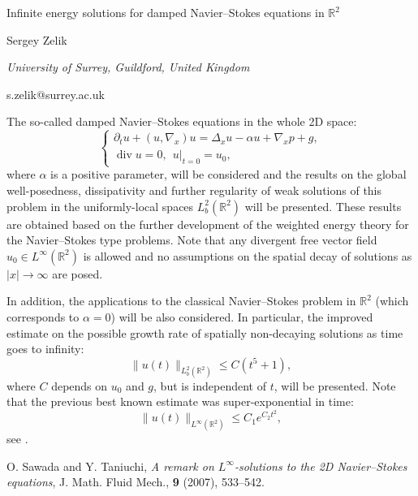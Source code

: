 \documentclass[10pt,a4paper]{article}
\def\R{\mathbb{R}}
\begin{document}
\begin{center}

{\Large Infinite energy solutions for damped Navier--Stokes equations in $\mathbb R^2$}

\bigskip

{\sc Sergey Zelik}

{\small\it  University of Surrey, Guildford, United Kingdom}

{\small\rm s.zelik@surrey.ac.uk}

\end{center}

\bigskip


The so-called damped Navier--Stokes equations in the whole 2D space:
\begin{equation*}
\begin{cases}
{\partial_t}u+(u,{\nabla_x})u={\Delta_x} u-\alpha u+{\nabla_x} p+g,\\ {\operatorname{div}}
u=0,\ \
u\big|_{t=0}=u_0,
\end{cases}
\end{equation*}
where $\alpha$ is a positive parameter, will be considered and the results on
the global well-posedness, dissipativity and further regularity of weak solutions of this problem
in the uniformly-local spaces $L^2_b(\R^2)$ will be presented. These results are obtained 
based on the further development of the weighted
energy theory for the Navier--Stokes type problems. Note that any divergent free vector field
$u_0\in L^\infty(\mathbb R^2)$ is allowed and no assumptions on the spatial decay of solutions as $|x|\to\infty$ are
posed.
\par
In addition, the applications to the classical Navier--Stokes
problem in $\mathbb R^2$ (which corresponds to $\alpha=0$) will be also considered. In particular, the improved estimate on the possible growth rate of spatially non-decaying solutions as time goes to infinity:
$$
\|u(t)\|_{L^2_b(\R^2)}\le C(t^5+1),
$$ 
where $C$ depends on $u_0$ and $g$, but is independent of $t$, will be presented. Note that the previous best known estimate was super-exponential in time:
$$
\|u(t)\|_{L^\infty(\R^2)}\le C_1e^{C_2 t^2},
$$
see \cite{ST07}.


\begin{thebibliography}{6}

 O. Sawada and Y. Taniuchi, \emph{A remark on $L^\infty$-solutions to the 2D Navier--Stokes equations}, J. Math. Fluid Mech., \textbf{9} (2007), 533--542.



\end{thebibliography}
\end{document}
